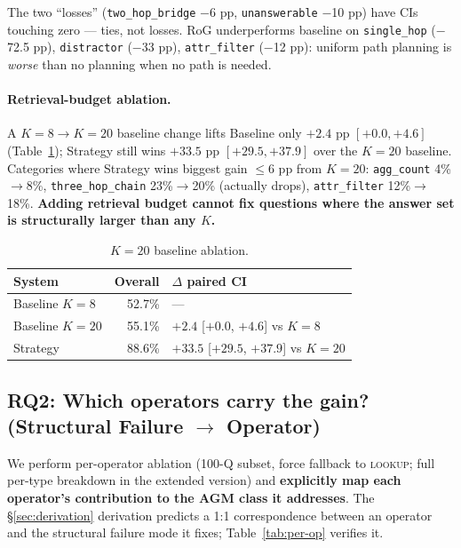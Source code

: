 \documentclass[10pt,a4paper,twocolumn]{article}
\newcommand{\qtype}[1]{\texttt{\small #1}}
\newcommand{\op}[1]{\textsc{\small #1}}
\begin{document}
The two ``losses'' (\qtype{two\_hop\_bridge} $-$6 pp, \qtype{unanswerable} $-$10 pp) have CIs touching zero --- ties, not losses. RoG underperforms baseline on \qtype{single\_hop} ($-$72.5 pp), \qtype{distractor} ($-$33 pp), \qtype{attr\_filter} ($-$12 pp): uniform path planning is \emph{worse} than no planning when no path is needed.

\paragraph{Retrieval-budget ablation.}
A $K\!=\!8 \to K\!=\!20$ baseline change lifts Baseline only $+2.4$ pp $[+0.0, +4.6]$ (Table~\ref{tab:k20}); Strategy still wins $+33.5$ pp $[+29.5, +37.9]$ over the $K\!=\!20$ baseline. Categories where Strategy wins biggest gain $\leq 6$ pp from $K\!=\!20$: \qtype{agg\_count} 4\%$\to$8\%, \qtype{three\_hop\_chain} 23\%$\to$20\% (actually drops), \qtype{attr\_filter} 12\%$\to$18\%. \textbf{Adding retrieval budget cannot fix questions where the answer set is structurally larger than any $K$.}

\begin{table}[h]
\centering
\small
\caption{$K\!=\!20$ baseline ablation.}
\label{tab:k20}
\begin{tabular}{l r l}
\toprule
\textbf{System} & \textbf{Overall} & \textbf{$\Delta$ paired CI} \\
\midrule
Baseline $K=8$  & 52.7\% & --- \\
Baseline $K=20$ & 55.1\% & $+2.4$ [$+0.0$, $+4.6$] vs $K=8$ \\
Strategy        & 88.6\% & $\mathbf{+33.5}$ [$+29.5$, $+37.9$] vs $K=20$ \\
\bottomrule
\end{tabular}
\end{table}

\subsection{RQ2: Which operators carry the gain? (Structural Failure \texorpdfstring{$\to$}{->} Operator)}
\label{sec:rq2}

We perform per-operator ablation (100-Q subset, force fallback to \op{lookup}; full per-type breakdown in the extended version) and \textbf{explicitly map each operator's contribution to the AGM class it addresses}. The §\ref{sec:derivation} derivation predicts a 1:1 correspondence between an operator and the structural failure mode it fixes; Table~\ref{tab:per-op} verifies it.
\end{document}
